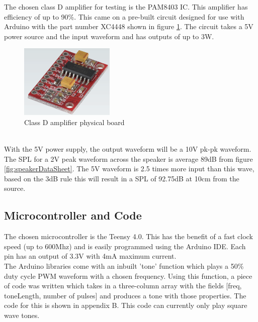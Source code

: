 \documentclass[12pt, a4paper]{article}
\begin{document}
The chosen class D amplifier for testing is the PAM8403 IC. This amplifier has efficiency of up to 90\%. This came on a pre-built circuit designed for use with Arduino with the part number XC4448 shown in figure \ref{fig:classDAmplifier}. The circuit takes a 5V power source and the input waveform and has outputs of up to 3W.
\begin{figure}[!htb]
	\hfill\includegraphics[width=0.4\textwidth]{./Figures/Class_D_Amp_Physical}\hspace*{\fill}
	\caption{Class D amplifier physical board}
	\label{fig:classDAmplifier}
\end{figure}\\
With the 5V power supply, the output waveform will be a 10V pk-pk waveform. The SPL for a 2V peak waveform across the speaker is average 89dB from figure \ref{fig:speakerDataSheet}. The 5V waveform is 2.5 times more input than this wave, based on the 3dB rule this will result in a SPL of 92.75dB at 10cm from the source. 

\subsection{Microcontroller and Code}
The chosen microcontroller is the Teensy 4.0. This has the benefit of a fast clock speed (up to 600Mhz) and is easily programmed using the Arduino IDE. Each pin has an output of 3.3V with 4mA maximum current. \\

The Arduino libraries come with an inbuilt 'tone' function which plays a 50\% duty cycle PWM waveform with a chosen frequency. Using this function, a piece of code was written which takes in a three-column array with the fields [freq, toneLength, number of pulses] and produces a tone with those properties. The code for this is shown in appendix B. This code can currently only play square wave tones.

\pagebreak
\end{document}
